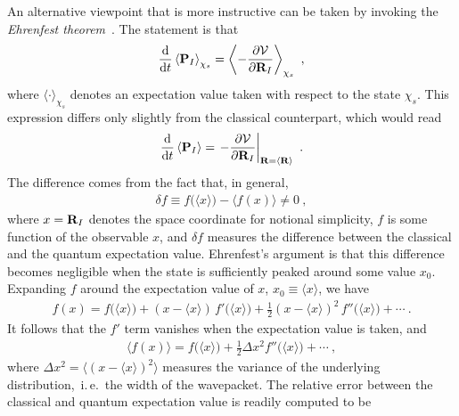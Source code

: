 An alternative viewpoint that is more instructive can be taken by invoking the \emph{Ehrenfest theorem}~\cite{Ehrenfest1927,Basdevant2007}. The statement is that
\begin{align}
  \frac{{\rm d}}{{\rm d} t} \left\langle {\bf P}_I \right\rangle_{\chi_s}
    = \left\langle
      - \frac{\partial \mathcal{V}}{\partial {\bf R}_I}
    \right\rangle_{\chi_s}~,
  \label{eq:ehrenfest.de1}
\end{align}
where $\langle \cdot \rangle_{\chi_s}$ denotes an expectation value taken with respect to the state $\chi_s$. This expression differs only slightly from the classical counterpart, which would read
\begin{align}
\frac{{\rm d}}{{\rm d} t} \left\langle {\bf P}_I \right\rangle
= \left.
- \frac{\partial \mathcal{V}}{\partial {\bf R}_I}
\right\vert_{{\bf R} = \langle {\bf R} \rangle}~.
\label{eq:ehrenfest.de2}
\end{align}
The difference comes from the fact that, in general,
\begin{align}
  \delta f  \equiv 
  f \bm ( \langle x \rangle \bm{)} 
  - 
  \bm{\langle} f (x) \bm{\rangle}
  \neq 0
  ~,
  \label{eq:ehrenfest.delta1}
\end{align}
where $x = {\bf R}_I$ denotes the space coordinate for notional simplicity, $f$ is some function of the observable $x$, and $\delta f$ measures the difference between the classical and the quantum expectation value. Ehrenfest's argument is that this difference becomes negligible when the state is sufficiently peaked around some value $x_0$. Expanding $f$ around the expectation value of $x$, $x_0 \equiv \langle x \rangle$, we have
\begin{align}
  f(x) = f \bm ( \langle x \rangle \bm{)}  
    + (x - \langle x \rangle) \, f' \bm ( \langle x \rangle \bm{)}
    + \frac{1}{2} (x - \langle x \rangle)^2 \, f'' \bm ( \langle x \rangle \bm{)}
    + \cdots~.
  \label{eq:ehrenfest.f2}
\end{align}
It follows that the $f'$ term vanishes when the expectation value is taken, and
\begin{align}
\langle f(x) \rangle 
  = f \bm ( \langle x \rangle \bm{)}  
    + \frac{1}{2} \Delta x^2 f'' \bm ( \langle x \rangle \bm{)}
    + \cdots~,
\label{eq:ehrenfest.f3}
\end{align}
where $\Delta x^2 = \bm{\langle} (x - \langle x \rangle)^2 \bm{\rangle}$ measures the variance of the underlying distribution,~i.\,e.~the width of the wavepacket. The relative error between the classical and quantum expectation value is readily computed to be
